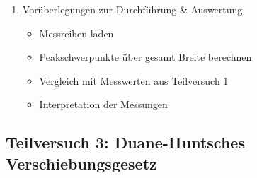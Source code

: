 \documentclass{article}
\begin{document}
\begin{enumerate}[label = (\Roman*)]
    \item Vorüberlegungen zur Durchführung \& Auswertung
        \begin{itemize}
            \item Messreihen laden
            \item Peakschwerpunkte über gesamt Breite berechnen
            \item Vergleich mit Messwerten aus Teilversuch 1
            \item Interpretation der Messungen
        \end{itemize}
        
\end{enumerate}


\newpage


\subsection{Teilversuch 3: Duane-Huntsches Verschiebungsgesetz}
\end{document}
